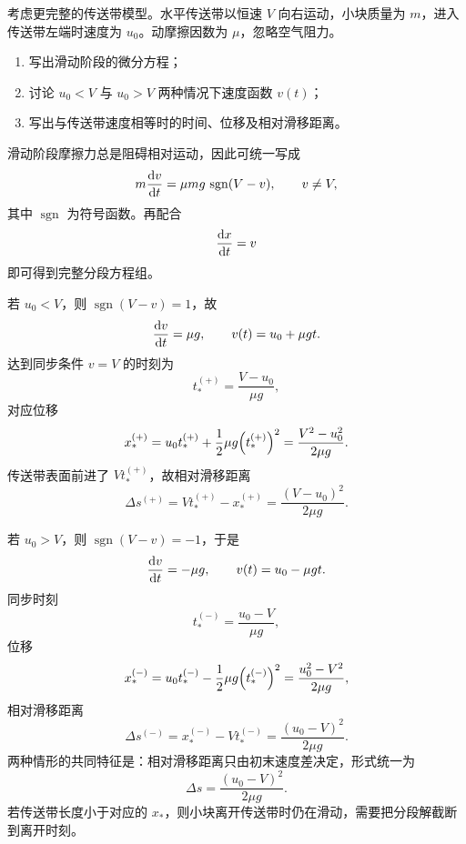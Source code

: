 \begin{problem}
考虑更完整的传送带模型。水平传送带以恒速 $V$ 向右运动，小块质量为 $m$，进入传送带左端时速度为 $u_0$。动摩擦因数为 $\mu$，忽略空气阻力。
\begin{enumerate}
  \item 写出滑动阶段的微分方程；
  \item 讨论 $u_0<V$ 与 $u_0>V$ 两种情况下速度函数 $v(t)$；
  \item 写出与传送带速度相等时的时间、位移及相对滑移距离。
\end{enumerate}
\begin{solution}
滑动阶段摩擦力总是阻碍相对运动，因此可统一写成
\[
m\dv{v}{t}=\mu mg\,\operatorname{sgn}(V-v),
\qquad v\ne V,
\]
其中 $\operatorname{sgn}$ 为符号函数。再配合
\[
\dv{x}{t}=v
\]
即可得到完整分段方程组。

若 $u_0<V$，则 $\operatorname{sgn}(V-v)=1$，故
\[
\dv{v}{t}=\mu g,
\qquad
v(t)=u_0+\mu gt.
\]
达到同步条件 $v=V$ 的时刻为
\[
t_*^{(+)}=\frac{V-u_0}{\mu g},
\]
对应位移
\[
x_*^{(+)}=u_0 t_*^{(+)}+\frac12 \mu g\qty(t_*^{(+)})^2
=\frac{V^2-u_0^2}{2\mu g}.
\]
传送带表面前进了 $Vt_*^{(+)}$，故相对滑移距离
\[
\Delta s^{(+)}=Vt_*^{(+)}-x_*^{(+)}=\frac{(V-u_0)^2}{2\mu g}.
\]

若 $u_0>V$，则 $\operatorname{sgn}(V-v)=-1$，于是
\[
\dv{v}{t}=-\mu g,
\qquad
v(t)=u_0-\mu gt.
\]
同步时刻
\[
t_*^{(-)}=\frac{u_0-V}{\mu g},
\]
位移
\[
x_*^{(-)}=u_0 t_*^{(-)}-\frac12 \mu g\qty(t_*^{(-)})^2
=\frac{u_0^2-V^2}{2\mu g},
\]
相对滑移距离
\[
\Delta s^{(-)}=x_*^{(-)}-Vt_*^{(-)}=\frac{(u_0-V)^2}{2\mu g}.
\]
两种情形的共同特征是：相对滑移距离只由初末速度差决定，形式统一为
\[
\Delta s=\frac{(u_0-V)^2}{2\mu g}.
\]
若传送带长度小于对应的 $x_*$，则小块离开传送带时仍在滑动，需要把分段解截断到离开时刻。
\end{solution}
\end{problem}

